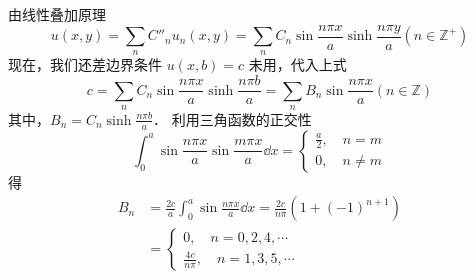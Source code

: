 由线性叠加原理
\begin{equation}
u(x,y)=\sum_n C''_n u_n(x,y)=\sum_n C_n\sin\frac{n\pi x}{a}\sinh\frac{n\pi y}{a}(n\in\mathbb{Z^+})
\end{equation}
现在，我们还差边界条件 $u(x,b)=c$ 未用，代入上式
\begin{equation}
c=\sum_n C_n\sin\frac{n\pi x}{a}\sinh\frac{n\pi b}{a}=\sum_n B_n\sin\frac{n\pi x}{a}(n\in \mathbb{Z})
\end{equation}
其中，$B_n=C_n\sinh \frac{n\pi b}{a}$．
利用三角函数的正交性
\begin{equation}
\int_0^a\sin\frac{n\pi x}{a}\sin\frac{m\pi x}{a}\dd x=\left\{\begin{aligned}
\frac{a}{2},\quad  n=m\\
0,\quad n\neq m
\end{aligned}\right.
\end{equation}
得
\begin{equation}
\begin{aligned}
B_n&=\frac{2c}{a}\int_0^a\sin\frac{n\pi x}{a}\dd x=\frac{2c}{n\pi}(1+(-1)^{n+1})\\
&=\left\{\begin{aligned}
0,\quad n=0,2,4,\cdots\\
\frac{4c}{n\pi},\quad n=1,3,5,\cdots
\end{aligned}\right.
\end{aligned}
\end{equation}

